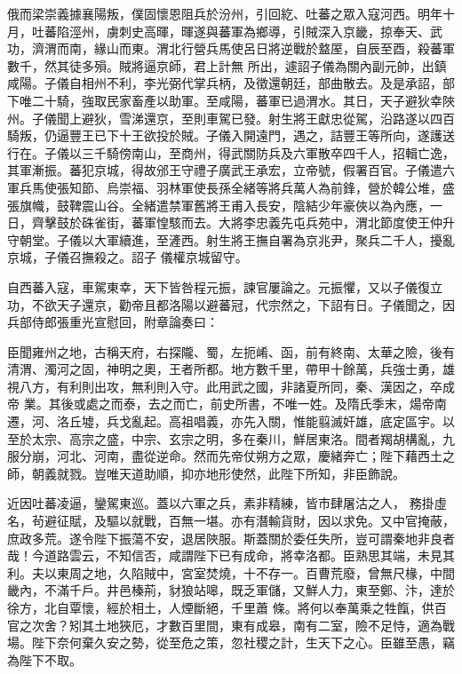 \begin{pinyinscope}
 俄而梁崇義據襄陽叛，僕固懷恩阻兵於汾州，引回紇、吐蕃之眾入寇河西。明年十月，吐蕃陷涇州，虜刺史高暉，暉遂與蕃軍為鄉導，引賊深入京畿，掠奉天、武功，濟渭而南，緣山而東。渭北行營兵馬使呂日將逆戰於盩厔，自辰至酉，殺蕃軍數千，然其徒多殞。賊將逼京師，君上計無
 所出，遽詔子儀為關內副元帥，出鎮咸陽。子儀自相州不利，李光弼代掌兵柄，及徵還朝廷，部曲散去。及是承詔，部下唯二十騎，強取民家畜產以助軍。至咸陽，蕃軍已過渭水。其日，天子避狄幸陜州。子儀聞上避狄，雪涕還京，至則車駕已發。射生將王獻忠從駕，沿路遂以四百騎叛，仍逼豐王已下十王欲投於賊。子儀入開遠門，遇之，詰豐王等所向，遂護送行在。子儀以三千騎傍南山，至商州，得武關防兵及六軍散卒四千人，招輯亡逸，
 其軍漸振。蕃犯京城，得故邠王守禮子廣武王承宏，立帝號，假署百官。子儀遣六軍兵馬使張知節、烏崇福、羽林軍使長孫全緒等將兵萬人為前鋒，營於韓公堆，盛張旗幟，鼓鞞震山谷。全緒遣禁軍舊將王甫入長安，陰結少年豪俠以為內應，一日，齊擊鼓於硃雀街，蕃軍惶駭而去。大將李忠義先屯兵苑中，渭北節度使王仲升守朝堂。子儀以大軍續進，至滻西。射生將王撫自署為京兆尹，聚兵二千人，擾亂京城，子儀召撫殺之。詔子
 儀權京城留守。



 自西蕃入寇，車駕東幸，天下皆咎程元振，諫官屢論之。元振懼，又以子儀復立功，不欲天子還京，勸帝且都洛陽以避蕃冠，代宗然之，下詔有日。子儀聞之，因兵部侍郎張重光宣慰回，附章論奏曰：



 臣聞雍州之地，古稱天府，右探隴、蜀，左扼崤、函，前有終南、太華之險，後有清渭、濁河之固，神明之奧，王者所都。地方數千里，帶甲十餘萬，兵強士勇，雄視八方，有利則出攻，無利則入守。此用武之國，非諸夏所同，秦、漢因之，卒成帝
 業。其後或處之而泰，去之而亡，前史所書，不唯一姓。及隋氏季末，煬帝南遷，河、洛丘墟，兵戈亂起。高祖唱義，亦先入關，惟能翦滅奸雄，底定區宇。以至於太宗、高宗之盛，中宗、玄宗之明，多在秦川，鮮居東洛。間者羯胡構亂，九服分崩，河北、河南，盡從逆命。然而先帝仗朔方之眾，慶緒奔亡；陛下藉西土之師，朝義就戮。豈唯天道助順，抑亦地形使然，此陛下所知，非臣飾說。



 近因吐蕃凌逼，鑾駕東巡。蓋以六軍之兵，素非精練，皆市肆屠沽之人，
 務掛虛名，茍避征賦，及驅以就戰，百無一堪。亦有潛輸貨財，因以求免。又中官掩蔽，庶政多荒。遂令陛下振蕩不安，退居陜服。斯蓋關於委任失所，豈可謂秦地非良者哉！今道路雲云，不知信否，咸謂陛下已有成命，將幸洛都。臣熟思其端，未見其利。夫以東周之地，久陷賊中，宮室焚燒，十不存一。百曹荒廢，曾無尺椽，中間畿內，不滿千戶。井邑榛荊，豺狼站嗥，既乏軍儲，又鮮人力，東至鄭、汴，達於徐方，北自覃懷，經於相土，人煙斷絕，千里蕭
 條。將何以奉萬乘之牲餼，供百官之次舍？矧其土地狹厄，才數百里間，東有成皋，南有二室，險不足恃，適為戰場。陛下奈何棄久安之勢，從至危之策，忽社稷之計，生天下之心。臣雖至愚，竊為陛下不取。




\end{pinyinscope}

